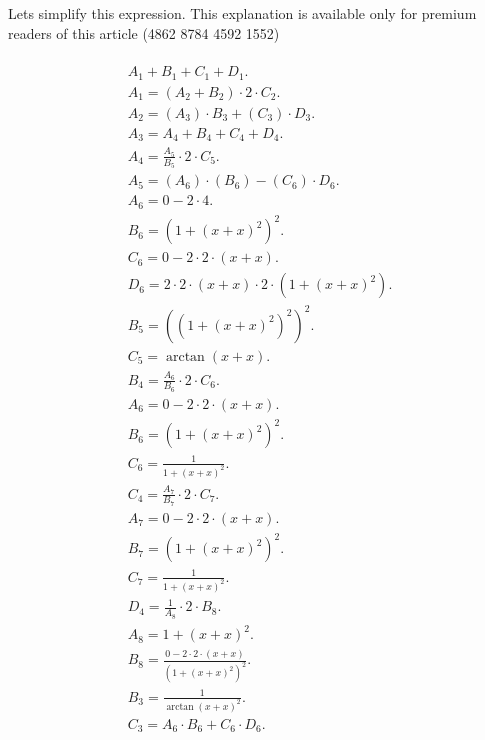\documentclass[12pt,a4paper]{extreport}
\begin{document}
Lets simplify this expression.
This explanation is available only for premium readers of this article (4862 8784 4592 1552) 

\begin{multline}
\\
A_{1} + B_{1} + C_{1} + D_{1}.\\
A_{1} = (A_{2} + B_{2}) \cdot 2 \cdot C_{2}.\\
A_{2} = (A_{3}) \cdot B_{3} + (C_{3}) \cdot D_{3}.\\
A_{3} = A_{4} + B_{4} + C_{4} + D_{4}.\\
A_{4} = \frac{A_{5}}{B_{5}} \cdot 2 \cdot C_{5}.\\
A_{5} = (A_{6}) \cdot (B_{6}) - (C_{6}) \cdot D_{6}.\\
A_{6} = 0 - 2 \cdot 4.\\
B_{6} = (1 + (x + x) ^ {2}) ^ {2}.\\
C_{6} = 0 - 2 \cdot 2 \cdot (x + x).\\
D_{6} = 2 \cdot 2 \cdot (x + x) \cdot 2 \cdot (1 + (x + x) ^ {2}).\\
B_{5} = ((1 + (x + x) ^ {2}) ^ {2}) ^ {2}.\\
C_{5} = \arctan(x + x).\\
B_{4} = \frac{A_{6}}{B_{6}} \cdot 2 \cdot C_{6}.\\
A_{6} = 0 - 2 \cdot 2 \cdot (x + x).\\
B_{6} = (1 + (x + x) ^ {2}) ^ {2}.\\
C_{6} = \frac{1}{1 + (x + x) ^ {2}}.\\
C_{4} = \frac{A_{7}}{B_{7}} \cdot 2 \cdot C_{7}.\\
A_{7} = 0 - 2 \cdot 2 \cdot (x + x).\\
B_{7} = (1 + (x + x) ^ {2}) ^ {2}.\\
C_{7} = \frac{1}{1 + (x + x) ^ {2}}.\\
D_{4} = \frac{1}{A_{8}} \cdot 2 \cdot B_{8}.\\
A_{8} = 1 + (x + x) ^ {2}.\\
B_{8} = \frac{0 - 2 \cdot 2 \cdot (x + x)}{(1 + (x + x) ^ {2}) ^ {2}}.\\
B_{3} = \frac{1}{\arctan(x + x) ^ {2}}.\\
C_{3} = A_{6} \cdot B_{6} + C_{6} \cdot D_{6}.\\
\end{multline}
\end{document}
